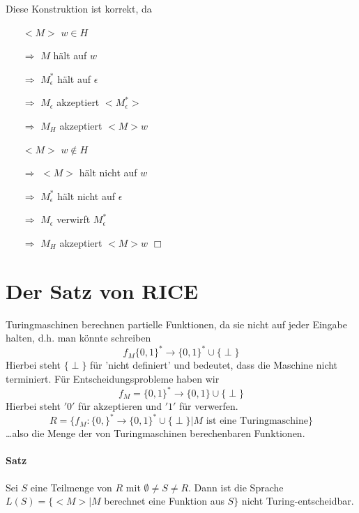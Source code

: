 \para{} Diese Konstruktion ist korrekt, da 
\begin{itemize}
	\item[$<M>$] $w \in H$
	\item[$\Rightarrow$] $M$ hält auf $w$
	\item[$\Rightarrow$] $M_\epsilon^*$ hält auf $\epsilon$
	\item[$\Rightarrow$] $M_\epsilon$ akzeptiert $<M_\epsilon^*>$
	\item[$\Rightarrow$] $M_H$ akzeptiert $<M>w$
	
	\item[$<M>$] $w \not\in H$
	\item[$\Rightarrow$] $<M>$ hält nicht auf $w$
	\item[$\Rightarrow$] $M_\epsilon^*$ hält nicht auf $\epsilon$
	\item[$\Rightarrow$] $M_\epsilon$ verwirft $M_\epsilon^*$
	\item[$\Rightarrow$] $M_H$ akzeptiert $<M>w$ \hspace{1cm} $\Box$
\end{itemize}


\section{Der Satz von RICE}

Turingmaschinen berechnen partielle Funktionen, da sie nicht auf jeder Eingabe halten, d.h. man könnte schreiben $$ f_M\{0,1\}^* \rightarrow \{0,1\}^*\cup\{\perp\} $$ Hierbei steht $\{\perp\}$ für 'nicht definiert' und bedeutet, dass die Maschine nicht terminiert. Für Entscheidungsprobleme haben wir $$ f_M=\{0,1\}^* \rightarrow \{0,1\}\cup\{\perp\}$$ Hierbei steht $'0'$ für akzeptieren und $'1'$ für verwerfen. $$ R=\{  f_M:\{0,\}^* \rightarrow \{0,1\}^*\cup\{\perp\}|M \text{ ist eine Turingmaschine}\} $$ \dots also die Menge der von Turingmaschinen berechenbaren Funktionen.

\paragraph*{Satz} Sei $S$ eine Teilmenge von $R$ mit $\emptyset\not=S\not=R$. Dann ist die Sprache $L(S)=\{<M>|M$ berechnet eine Funktion aus $S\}$ nicht Turing-entscheidbar.

